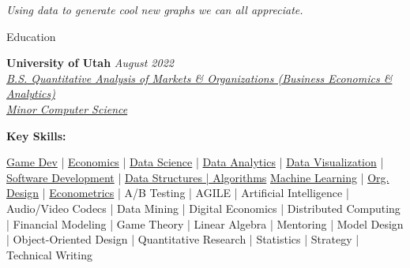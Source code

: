 \documentclass{resume/resume}
\begin{document}

\begin{center}
 \vspace{-1em}
 {\em
    Using data to generate cool new graphs we can all appreciate.
 }
 \vspace{-10pt}
\end{center}


\begin{rSection}{Education}

{\bf University of Utah} \hfill {\em August 2022}
\vspace{2pt}
\emph{
    \\ \href{https://eccles.utah.edu/programs/undergraduate/academics/majors/qamo/}{B.S. Quantitative Analysis of Markets \& Organizations (Business Economics \& Analytics)}
    \\ \href{https://github.com/search?o=desc&q=user\%3ASpelkington&s=updated&type=Repositories}{Minor Computer Science}
}


{\bf Key Skills:}
\vspace{-1.83em}

\begin{adjustwidth}{6em}{0pt}
    \href{https://spelkington.github.io/Because-I-Cannot-Draw/}{Game Dev} |  %
    \href{https://www.youtube.com/watch?v=lMFQp3wN-cg}{Economics} |  %
    \href{https://github.com/Spelkington/mlearning}{Data Science} |  %
    \href{https://github.com/UtahTriangle/Laws/blob/main/Proposals/NationalsHelp/figures/distances.pdf}{Data Analytics} |  %
    \href{https://spelkington.github.io/assets/utah_office_update.pdf}{Data Visualization} |  %
    \href{https://github.com/spelkington}{Software Development} |
    \href{https://www.youtube.com/watch?v=lMFQp3wN-cg}{Data Structures | Algorithms}
    \href{https://github.com/Spelkington/mlearning}{Machine Learning} |  %
    \href{https://spelkington.github.io/assets/utah_office_update.pdf}{Org. Design} |  %
    \href{https://github.com/Spelkington/econometrics}{Econometrics} |  %
    A/B Testing | 
    AGILE | 
    Artificial Intelligence | 
    Audio/Video Codecs | 
    Data Mining | 
    Digital Economics | 
    Distributed Computing |
    Financial Modeling |
    Game Theory | 
    Linear Algebra | 
    Mentoring |
    Model Design | 
    Object-Oriented Design |
    Quantitative Research |
    Statistics |
    Strategy |
    Technical Writing
    

\end{adjustwidth}
\end{rSection}
\end{document}
